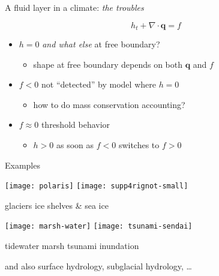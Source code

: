 \documentclass{beamer}
\newcommand\bq{\mathbf{q}}
\newcommand{\Div}{\nabla\cdot}
\begin{document}
\begin{frame}{A fluid layer in a climate: \emph{the troubles}}

\vspace{-1.2mm}

\begin{center}
\end{center}

\vspace{-18mm}
$$h_t + \Div\bq = f$$

  \begin{itemize}
  \item<1-> $h=0$ \emph{and what else} at free boundary?
     \begin{itemize}
     \item<1->[$\circ$] shape at free boundary depends on both $\bq$ and $f$
     \end{itemize}
  \item<2-> $f<0$ not ``detected'' by model where $h=0$
     \begin{itemize}
     \item<2->[$\circ$] how to do mass conservation accounting?
     \end{itemize}
  \item<3> $f\approx 0$ threshold behavior
     \begin{itemize}
     \item<3>[$\circ$] $h>0$ as soon as $f<0$ switches to $f>0$
     \end{itemize}
  \end{itemize}
\end{frame}


\begin{frame}{Examples}

\texttt{[image: polaris]}
\hfill
\texttt{[image: supp4rignot-small]}

\small glaciers \hfill ice shelves \& sea ice

\medskip
\texttt{[image: marsh-water]}
\hfill
\texttt{[image: tsunami-sendai]}

\small tidewater marsh \hfill tsunami inundation

\medskip
\scriptsize and also surface hydrology, subglacial hydrology, \dots
\end{frame}
\end{document}
